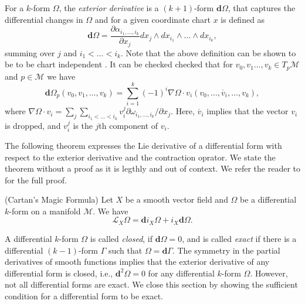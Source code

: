For a $k$-form $\Omega$, the \emph{exterior derivative} is a $(k+1)$-form $\mathbf d \Omega$, that captures the differential changes in $\Omega$ and for a given coordinate chart $x$ is defined as
\begin{equation} \label{eq:2.13}
	\mathbf d \Omega = \frac{\partial \alpha_{i_1,\dots,i_k}}{\partial x_j} dx_j\wedge dx_{i_1}\wedge\dots\wedge dx_{i_k},
\end{equation}
summing over $j$ and $i_1<\dots<i_k$. Note that the above definition can be shown to be to be chart independent \cite{rudin1964principles}. It can be checked checked that for $v_0,v_1\dots,v_k \in T_p\mathcal M$ and $p\in \mathcal M$ we have
\begin{equation} \label{eq:2.14}
	\mathbf d \Omega_p(v_0,v_1,\dots,v_k) = \sum_{i=1}^k (-1)^i \nabla \Omega \cdot v_i (v_0,\dots,\mathring{v_i},\dots,v_k), 
\end{equation}
where $\nabla \Omega \cdot v_i = \sum_j \sum_{i_1<\dots<i_k} v_i^j \partial \omega_{i_1,\dots,i_k}/\partial x_j$. Here, $\mathring{v_i}$ implies that the vector $v_i$ is dropped, and $v_i^j$ is the $j$th component of $v_i$. 

The following theorem expresses the Lie derivative of a differential form with respect to the exterior derivative and the contraction oprator. We state the theorem without a proof as it is legthly and out of context. We refer the reader to \cite{abraham1978foundations} for the full proof.

\begin{theorem} \cite{abraham1978foundations}
(Cartan's Magic Formula) Let $X$ be a smooth vector field and $\Omega$ be a differential $k$-form on a manifold $\mathcal M$. We have
\begin{equation}
	\mathcal L_X \Omega = \mathbf d i_X \Omega + i_X \mathbf d \Omega.
\end{equation}
\end{theorem}

A differential $k$-form $\Omega$ is called \emph{closed}, if $\mathbf d \Omega = 0$, and is called \emph{exact} if there is a differential $(k-1)$-form $\Gamma$ such that $\Omega = \mathbf d \Gamma$. The symmetry in the partial derivatives of smooth functions implies that the exterior derivative of any differential form is closed, i.e., $\mathbf d^2 \Omega = 0$ for any differential $k$-form $\Omega$. However, not all differential forms are exact. We close this section by showing the sufficient condition for a differential form to be exact.

